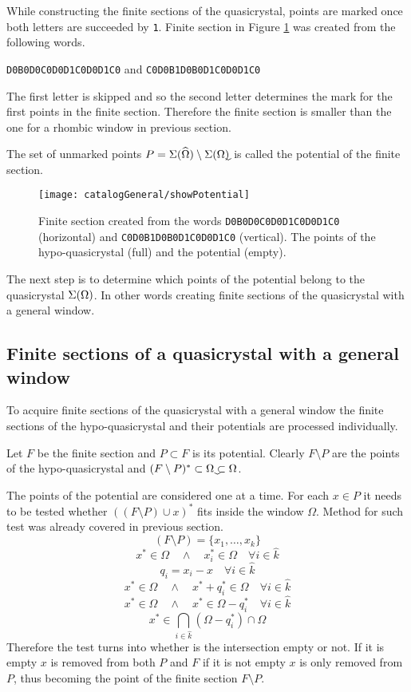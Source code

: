 \documentclass[text.tex]{subfiles}
\begin{document}
While constructing the finite sections of the quasicrystal, points are marked once both letters are succeeded by \texttt{1}. Finite section in Figure \ref{fig:showPotential} was created from the following words.
\begin{center}\texttt{D0B0D0C0D0D1C0D0D1C0} and \texttt{C0D0B1D0B0D1C0D0D1C0}\end{center}
The first letter is skipped and so the second letter determines the mark for the first points in the finite section. Therefore the finite section is smaller than the one for a rhombic window in previous section. 

The set of unmarked points $P = \quasi{\widehat{\Omega}}\setminus \quasi{\uwidehat{\Omega}}$ is called the potential of the finite section. 

\begin{figure}[h!]
\centering
\texttt{[image: catalogGeneral/showPotential]}
\caption{Finite section created from the words \texttt{D0B0D0C0D0D1C0D0D1C0} (horizontal) and \texttt{C0D0B1D0B0D1C0D0D1C0} (vertical). The points of the hypo-quasicrystal (full) and the potential (empty).}
\label{fig:showPotential}
\end{figure}

The next step is to determine which points of the potential belong to the quasicrystal $\Sigma(\Omega)$. In other words creating finite sections of the quasicrystal with a general window.

\subsection{Finite sections of a quasicrystal with a general window}
To acquire finite sections of the quasicrystal with a general window the finite sections of the hypo-quasicrystal and their potentials are processed individually. 

Let $F$ be the finite section and $P\subset F$ is its potential. Clearly $F\setminus P$ are the points of the hypo-quasicrystal and $(F\setminus P)^\ast \subset \uwidehat{\Omega}\subset\Omega$.

The points of the potential are considered one at a time. For each $x\in P$ it needs to be tested whether $((F\setminus P)\cup x)^\ast$ fits inside the window $\Omega$. Method for such test was already covered in previous section.
$$(F\setminus P) = \{x_1,\dots,x_k\}$$
$$x^\ast\in\Omega \quad\wedge\quad x_i^\ast\in\Omega \quad\forall i\in\hat{k}$$
$$q_i = x_i - x \quad\forall i\in\hat{k}$$
$$x^\ast\in\Omega \quad\wedge\quad x^\ast+q_i^\ast\in\Omega \quad\forall i\in\hat{k}$$
$$x^\ast\in\Omega \quad\wedge\quad x^\ast\in\Omega-q_i^\ast \quad\forall i\in\hat{k}$$
$$x^\ast\in\bigcap\limits_{i\in\hat{k}}(\Omega-q_i^\ast)\cap\Omega$$
Therefore the test turns into whether is the intersection empty or not. If it is empty $x$ is removed from both $P$ and $F$ if it is not empty $x$ is only removed from $P$, thus becoming the point of the finite section $F\setminus P$. 
\end{document}
